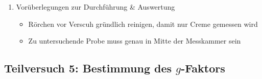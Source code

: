 \documentclass{article}
\begin{document}
\begin{enumerate}[label = (\Roman*)]
    \item Vorüberlegungen zur Durchführung \& Auswertung
        \begin{itemize}
            \item Rörchen vor Verscuh gründlich reinigen, damit nur Creme gemessen wird
            \item Zu untersuchende Probe muss genau in Mitte der Messkammer sein
        \end{itemize}
        
\end{enumerate}


\newpage

\subsection{Teilversuch 5: Bestimmung des $g$-Faktors}
\end{document}
